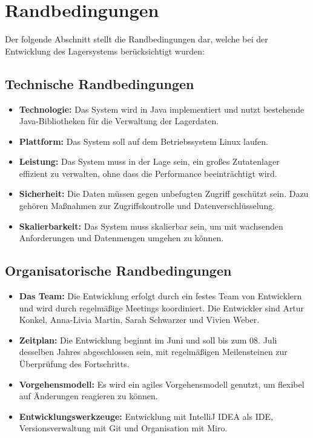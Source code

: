 \section{Randbedingungen}\label{sec: randbedingungen}
Der folgende Abschnitt stellt die Randbedingungen dar, welche bei der Entwicklung des Lagersystems berücksichtigt wurden:

\subsection{Technische Randbedingungen}\label{subsec: technische-randbedingungen}
\begin{itemize}
    \item \textbf{Technologie:} Das System wird in Java implementiert und nutzt bestehende Java-Bibliotheken für die Verwaltung der Lagerdaten.
    \item \textbf{Plattform:} Das System soll auf dem Betriebssystem Linux laufen.
    \item \textbf{Leistung:} Das System muss in der Lage sein, ein großes Zutatenlager effizient zu verwalten, ohne dass die Performance beeinträchtigt wird.
    \item \textbf{Sicherheit:} Die Daten müssen gegen unbefugten Zugriff geschützt sein. Dazu gehören Maßnahmen zur Zugriffskontrolle und Datenverschlüsselung.
    \item \textbf{Skalierbarkeit:} Das System muss skalierbar sein, um mit wachsenden Anforderungen und Datenmengen umgehen zu können.
\end{itemize}

\subsection{Organisatorische Randbedingungen}\label{subsec: organisatorische-randbedingungen}

\begin{itemize}
    \item \textbf{Das Team:} Die Entwicklung erfolgt durch ein festes Team von Entwicklern und wird durch regelmäßige Meetings koordiniert. Die Entwickler sind Artur Konkel, Anna-Livia Martin, Sarah Schwarzer und Vivien Weber.
    \item \textbf{Zeitplan:} Die Entwicklung beginnt im Juni und soll bis zum 08. Juli desselben Jahres abgeschlossen sein, mit regelmäßigen Meilensteinen zur Überprüfung des Fortschritts.
    \item \textbf{Vorgehensmodell:} Es wird ein agiles Vorgehensmodell genutzt, um flexibel auf Änderungen reagieren zu können.
    \item \textbf{Entwicklungswerkzeuge:} Entwicklung mit IntelliJ IDEA als IDE, Versionsverwaltung mit Git und Organisation mit Miro.
\end{itemize}

